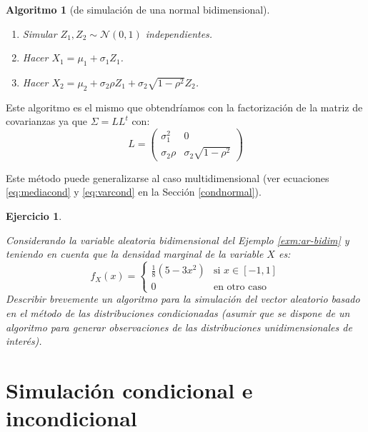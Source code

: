 \documentclass[
  10pt,
]{book}
\theoremstyle{break}
\newtheorem{conjecture}{Algoritmo}[chapter]
\newtheorem{exercise}{Ejercicio}[chapter]
\theoremstyle{nonumberplain}
\begin{document}
\begin{conjecture}[de simulación de una normal bidimensional]
\protect\hypertarget{cnj:norm-bidim-cond}{}\label{cnj:norm-bidim-cond}

\begin{enumerate}
\def\labelenumi{\arabic{enumi}.}
\item
  Simular \(Z_1, Z_2 \sim \mathcal{N}\left( 0, 1 \right)\) independientes.
\item
  Hacer \(X_1 = \mu_1 + \sigma_1 Z_1\).
\item
  Hacer \(X_2 = \mu_2 + \sigma_2 \rho Z_1 + \sigma_2 \sqrt{1-\rho^2} Z_2\).
\end{enumerate}

\end{conjecture}

Este algoritmo es el mismo que obtendríamos con la factorización de la matriz de covarianzas ya que \(\Sigma = L L^t\) con:
\[L = \begin{pmatrix}
 \sigma^2_1 &  0 \\
 \sigma_2 \rho &  \sigma_2  \sqrt{1-\rho^2}
\end{pmatrix}\]

Este método puede generalizarse al caso multidimensional (ver ecuaciones \eqref{eq:mediacond} y \eqref{eq:varcond} en la Sección \ref{condnormal}).

\begin{exercise}
\protect\hypertarget{exr:cond2d}{}\label{exr:cond2d}

Considerando la variable aleatoria bidimensional del Ejemplo \ref{exm:ar-bidim} y teniendo en cuenta que la densidad marginal de la variable \(X\) es:
\[f_{X}(x)= \left\{ 
\begin{array}{cl}
\frac{1}{8}\left( 5-3x^2\right)  & \text{si }x\in [-1, 1] \\ 
0 & \text{en otro caso}
\end{array}
\right.\]
Describir brevemente un algoritmo para la simulación del vector aleatorio basado en el método de las distribuciones condicionadas (asumir que se dispone de un algoritmo para generar observaciones de las distribuciones unidimensionales de interés).
\end{exercise}

\hypertarget{simulaciuxf3n-condicional-e-incondicional}{%
\section{Simulación condicional e incondicional}\label{simulaciuxf3n-condicional-e-incondicional}}
\end{document}
